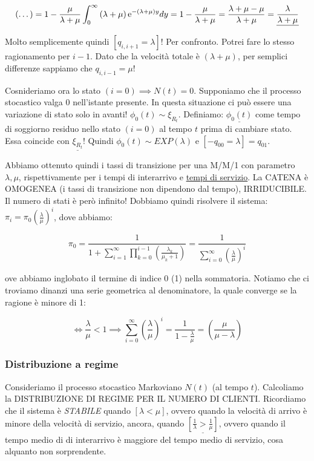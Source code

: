 \[	
	(\dots) = 1-\frac{\mu}{\lambda+\mu}\int_0^\infty{(\lambda+\mu)\mathop{}\!\mathrm{e}^{-(\lambda+\mu)y}dy} = 1-\frac{\mu}{\lambda+\mu} = \frac{\lambda+\mu-\mu}{\lambda+\mu} = \underline{\frac{\lambda}{\lambda+\mu}}
\]

Molto semplicemente quindi $[q_{i,i+1} = \lambda]$! Per confronto. Potrei fare lo stesso ragionamento per $i-1$. Dato che la velocità totale è $(\lambda+\mu)$, per semplici differenze sappiamo che $q_{i,i-1} = \mu$!

Cosnideriamo ora lo stato $(i=0) \implies N(t) = 0$. Supponiamo che il processo stocastico valga 0 nell'istante presente. In questa situazione ci può essere una variazione di stato solo in avanti! $\phi_0(t) \sim \xi_{R_t}$. Definiamo: $\underline{\phi_0(t)}$ come tempo di soggiorno residuo nello stato $(i=0)$ al tempo $t$ prima di cambiare stato. Essa coincide con $\underline{\xi_{R_t}}$! Quindi $\phi_0(t) \sim EXP(\lambda)$ e $[-q_{00} = \lambda] = q_{01}$. 

Abbiamo ottenuto quindi i tassi di transizione per una M/M/1 con parametro $\lambda,\mu$, rispettivamente per i tempi di interarrivo e \underline{tempi di servizio}. La CATENA è OMOGENEA (i tassi di transizione non dipendono dal tempo), IRRIDUCIBILE. Il numero di stati è però infinito! Dobbiamo quindi risolvere il sistema: $\pi_i = \pi_0 (\frac{\lambda}{\mu})^i$, dove abbiamo:

\[
	\pi_0 = \frac{1}{1+\sum_{i=1}^\infty{\prod_{k=0}^{i-1}{(\frac{\lambda_k}{\mu_k+1})}}} = \frac{1}{\sum_{i=0}^\infty{(\frac{\lambda}{\mu})^i}}
\]

ove abbiamo inglobato il termine di indice 0 (1) nella sommatoria. Notiamo che ci troviamo dinanzi una serie geometrica al denominatore, la quale converge se la ragione è minore di 1:

\[
	\iff \frac{\lambda}{\mu} < 1 \implies \sum_{i=0}^\infty{(\frac{\lambda}{\mu})^i} = \frac{1}{1-\frac{\lambda}{\mu}} = (\frac{\mu}{\mu-\lambda})
\]

\subsubsection{Distribuzione a regime}

Consideriamo il processo stocastico Markoviano $N(t)$ (al tempo $t$). Calcoliamo la DISTRIBUZIONE DI REGIME PER IL NUMERO DI CLIENTI. Ricordiamo che il sistema è \textit{STABILE} quando $[\lambda < \mu]$, ovvero quando la velocità di arrivo è minore della velocità di servizio, ancora, quando $\underline{[\frac{1}{\lambda} > \frac{1}{\mu}]}$, ovvero quando il tempo medio di di interarrivo è maggiore del tempo medio di servizio, cosa alquanto non sorprendente. 

